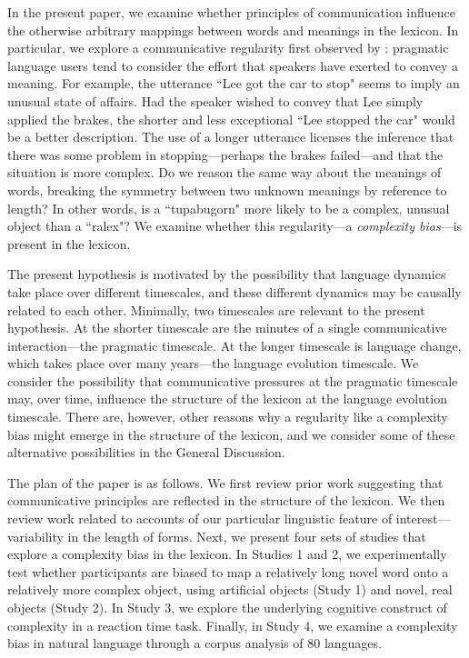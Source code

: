\documentclass[man]{apa2}
\begin{document}
In the present paper, we examine whether principles of communication influence the otherwise arbitrary mappings between words and meanings in the lexicon. In particular, we explore a communicative regularity first observed by : pragmatic language users tend to consider the effort that speakers have exerted to convey a meaning. For example, the utterance ``Lee got the car to stop" seems to imply an unusual state of affairs. Had the speaker wished to convey that Lee simply applied the brakes, the shorter and less exceptional ``Lee stopped the car" would be a better description. The use of a longer utterance licenses the inference that there was some problem in stopping---perhaps the brakes failed---and that the situation is more complex. Do we reason the same way about the meanings of words, breaking the symmetry between two unknown meanings by reference to length? In other words, is a ``tupabugorn" more likely to be a complex, unusual object than a ``ralex"? We examine whether this  regularity---a {\it complexity bias}---is present in the lexicon.

The present hypothesis is motivated by the possibility that language dynamics take place over different timescales, and these different dynamics may be causally related to each other.  Minimally, two timescales are relevant to the present hypothesis. At the shorter timescale are the minutes of a single communicative interaction---the pragmatic timescale. At the longer timescale is language change, which takes place over many years---the language evolution timescale. We consider the possibility that communicative pressures at the pragmatic timescale may, over time, influence the structure of the lexicon at the language evolution timescale. There are, however, other reasons why a regularity like a complexity bias might emerge in the structure of the lexicon, and we consider some of these alternative possibilities in the General Discussion.

The plan of the paper is as follows. We first review prior work suggesting that communicative principles are reflected in the structure of the lexicon. We then review work related to accounts of our particular linguistic feature of interest---variability in the length of forms. Next, we   present four sets of studies that explore a complexity bias in the lexicon. In Studies 1 and 2, we  experimentally test whether participants are biased to map a relatively long novel word onto a relatively more complex object, using artificial objects (Study 1) and novel, real objects (Study 2). In Study 3, we explore the underlying cognitive construct of complexity in a reaction time task. Finally, in Study 4, we examine a complexity bias in natural language through a corpus analysis of 80 languages.
\end{document}
